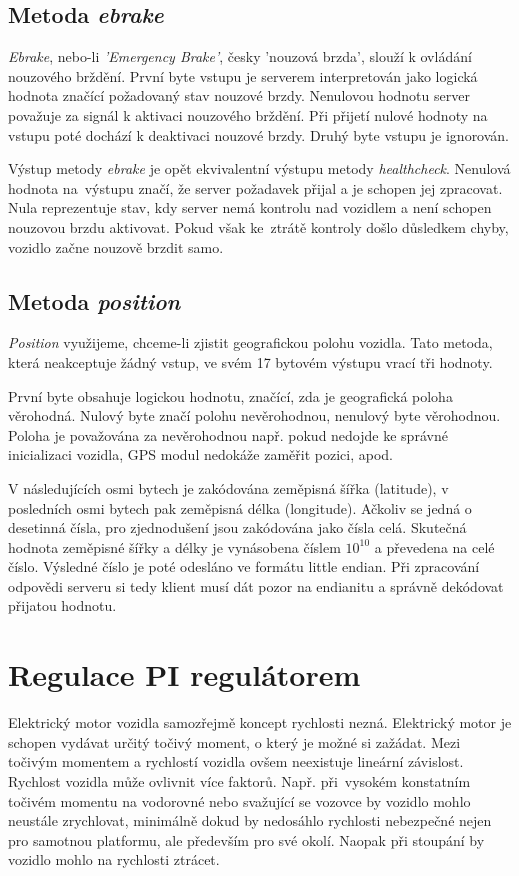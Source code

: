 \documentclass[czech, bachelor]{diploma}
\begin{document}
\subsection{Metoda \emph{ebrake}}
\emph{Ebrake}, nebo-li \emph{'Emergency Brake'}, česky 'nouzová brzda', slouží k ovládání nouzového brždění. První byte vstupu
je serverem interpretován jako logická hodnota značící požadovaný stav nouzové brzdy. Nenulovou hodnotu server považuje za signál
k aktivaci nouzového brždění. Při přijetí nulové hodnoty na vstupu poté dochází k deaktivaci nouzové brzdy. Druhý byte vstupu
je ignorován.

Výstup metody \emph{ebrake} je opět ekvivalentní výstupu metody \emph{healthcheck}. Nenulová hodnota na~výstupu značí, že server
požadavek přijal a je schopen jej zpracovat. Nula reprezentuje stav, kdy server nemá kontrolu nad vozidlem a není schopen
nouzovou brzdu aktivovat. Pokud však ke~ztrátě kontroly došlo důsledkem chyby, vozidlo začne nouzově brzdit samo.

\subsection{Metoda \emph{position}}

\emph{Position} využijeme, chceme-li zjistit geografickou polohu vozidla. Tato metoda, která neakceptuje žádný vstup, ve svém
17 bytovém výstupu vrací tři hodnoty.

První byte obsahuje logickou hodnotu, značící, zda je geografická poloha věrohodná. Nulový byte značí polohu nevěrohodnou,
nenulový byte věrohodnou. Poloha je považována za nevěrohodnou např. pokud nedojde ke správné inicializaci vozidla, GPS modul
nedokáže zaměřit pozici, apod.

V následujících osmi bytech je zakódována zeměpisná šířka (latitude), v posledních osmi bytech pak zeměpisná délka (longitude).
Ačkoliv se jedná o desetinná čísla, pro zjednodušení jsou zakódována jako čísla celá. Skutečná hodnota zeměpisné šířky a délky
je vynásobena číslem $10^{10}$ a převedena na celé číslo. Výsledné číslo je poté odesláno ve formátu little endian. Při zpracování
odpovědi serveru si tedy klient musí dát pozor na endianitu a správně dekódovat přijatou hodnotu.

\section{Regulace PI regulátorem} \label{pi-controller}
Elektrický motor vozidla samozřejmě koncept rychlosti nezná. Elektrický motor je schopen vydávat určitý točivý moment, o který
je možné si zažádat. Mezi točivým momentem a rychlostí vozidla ovšem neexistuje lineární závislost. Rychlost vozidla může ovlivnit
více faktorů. Např. při~vysokém konstatním točivém momentu na vodorovné nebo svažující se vozovce by vozidlo mohlo neustále
zrychlovat, minimálně dokud by nedosáhlo rychlosti nebezpečné nejen pro samotnou platformu, ale především pro své okolí. Naopak
při stoupání by vozidlo mohlo na rychlosti ztrácet.
\end{document}
